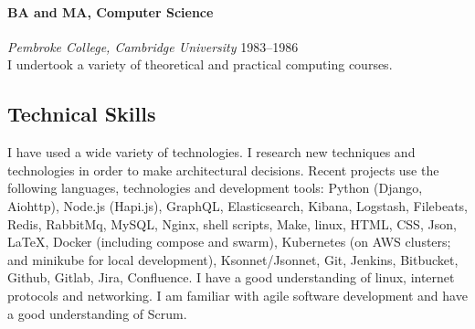 \documentclass[11pt,a4paper]{article}
\newcommand{\centry}[3]{\paragraph{#1} \textit{#2}%
\hfill#3\\[2pt]}
\begin{document}
\centry{BA and MA, Computer Science}{Pembroke College, Cambridge University}{1983--1986}
I undertook a variety of theoretical and practical computing courses.

\subsection*{Technical Skills}

I have used a wide variety of technologies. I research new techniques and
technologies in order to make architectural decisions. Recent projects use the
following languages, technologies and development tools: Python (Django,
Aiohttp), Node.js (Hapi.js), GraphQL, Elasticsearch, Kibana, Logstash,
Filebeats, Redis, RabbitMq, MySQL, Nginx, shell scripts, Make, linux, HTML,
CSS, Json, \LaTeX, Docker (including compose and swarm), Kubernetes (on AWS
clusters; and minikube for local development), Ksonnet/Jsonnet, Git, Jenkins,
Bitbucket, Github, Gitlab, Jira, Confluence. I have a good understanding of
linux, internet protocols and networking. I am familiar with agile software
development and have a good understanding of Scrum.
\end{document}
